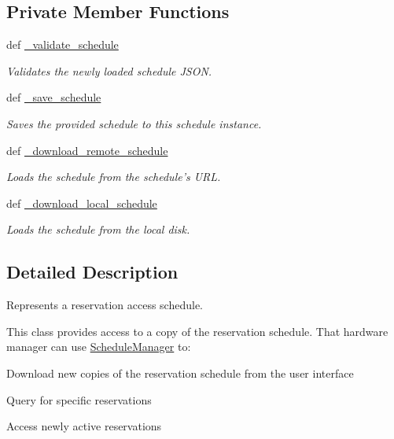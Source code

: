 \subsection*{Private Member Functions}
\begin{DoxyCompactItemize}
\item 
def \hyperlink{classhwm_1_1sessions_1_1schedule_1_1_schedule_manager_a022e98a41d6254ab8be51509089c11e2}{\-\_\-validate\-\_\-schedule}
\begin{DoxyCompactList}\small\item\em Validates the newly loaded schedule J\-S\-O\-N. \end{DoxyCompactList}\item 
def \hyperlink{classhwm_1_1sessions_1_1schedule_1_1_schedule_manager_a969595d4ed4ef73bf5709a4910afb548}{\-\_\-save\-\_\-schedule}
\begin{DoxyCompactList}\small\item\em Saves the provided schedule to this schedule instance. \end{DoxyCompactList}\item 
def \hyperlink{classhwm_1_1sessions_1_1schedule_1_1_schedule_manager_a4eb795805cbf4dd66c7c4774f9c07ea9}{\-\_\-download\-\_\-remote\-\_\-schedule}
\begin{DoxyCompactList}\small\item\em Loads the schedule from the schedule's U\-R\-L. \end{DoxyCompactList}\item 
def \hyperlink{classhwm_1_1sessions_1_1schedule_1_1_schedule_manager_ab40776c55c8d1f12a0d59f55bc716675}{\-\_\-download\-\_\-local\-\_\-schedule}
\begin{DoxyCompactList}\small\item\em Loads the schedule from the local disk. \end{DoxyCompactList}\end{DoxyCompactItemize}


\subsection{Detailed Description}
Represents a reservation access schedule. 

This class provides access to a copy of the reservation schedule. That hardware manager can use \hyperlink{classhwm_1_1sessions_1_1schedule_1_1_schedule_manager}{Schedule\-Manager} to\-:
\begin{DoxyItemize}
\item Download new copies of the reservation schedule from the user interface
\item Query for specific reservations
\item Access newly active reservations 
\end{DoxyItemize}

